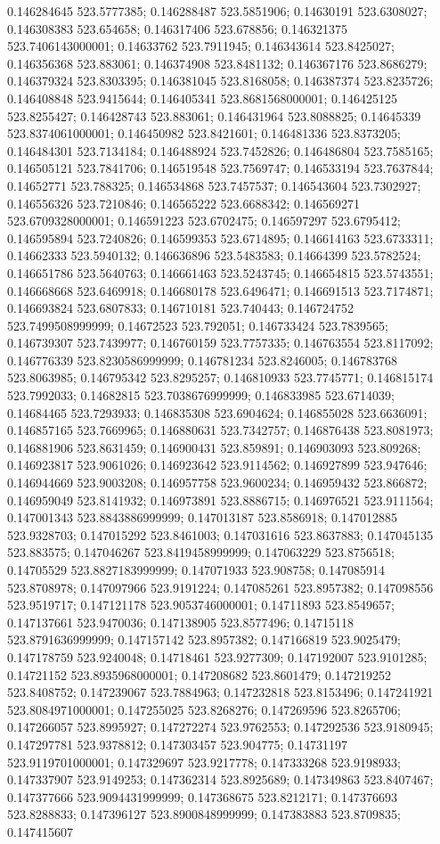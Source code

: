 0.146284645 523.5777385; 0.146288487 523.5851906; 0.14630191 523.6308027; 0.146308383 523.654658; 0.146317406 523.678856; 0.146321375 523.7406143000001; 0.14633762 523.7911945; 0.146343614 523.8425027; 0.146356368 523.883061; 0.146374908 523.8481132; 0.146367176 523.8686279; 0.146379324 523.8303395; 0.146381045 523.8168058; 0.146387374 523.8235726; 0.146408848 523.9415644; 0.146405341 523.8681568000001; 0.146425125 523.8255427; 0.146428743 523.883061; 0.146431964 523.8088825; 0.14645339 523.8374061000001; 0.146450982 523.8421601; 0.146481336 523.8373205; 0.146484301 523.7134184; 0.146488924 523.7452826; 0.146486804 523.7585165; 0.146505121 523.7841706; 0.146519548 523.7569747; 0.146533194 523.7637844; 0.14652771 523.788325; 0.146534868 523.7457537; 0.146543604 523.7302927; 0.146556326 523.7210846; 0.146565222 523.6688342; 0.146569271 523.6709328000001; 0.146591223 523.6702475; 0.146597297 523.6795412; 0.146595894 523.7240826; 0.146599353 523.6714895; 0.146614163 523.6733311; 0.14662333 523.5940132; 0.146636896 523.5483583; 0.14664399 523.5782524; 0.146651786 523.5640763; 0.146661463 523.5243745; 0.146654815 523.5743551; 0.146668668 523.6469918; 0.146680178 523.6496471; 0.146691513 523.7174871; 0.146693824 523.6807833; 0.146710181 523.740443; 0.146724752 523.7499508999999; 0.14672523 523.792051; 0.146733424 523.7839565; 0.146739307 523.7439977; 0.146760159 523.7757335; 0.146763554 523.8117092; 0.146776339 523.8230586999999; 0.146781234 523.8246005; 0.146783768 523.8063985; 0.146795342 523.8295257; 0.146810933 523.7745771; 0.146815174 523.7992033; 0.14682815 523.7038676999999; 0.146833985 523.6714039; 0.14684465 523.7293933; 0.146835308 523.6904624; 0.146855028 523.6636091; 0.146857165 523.7669965; 0.146880631 523.7342757; 0.146876438 523.8081973; 0.146881906 523.8631459; 0.146900431 523.859891; 0.146903093 523.809268; 0.146923817 523.9061026; 0.146923642 523.9114562; 0.146927899 523.947646; 0.146944669 523.9003208; 0.146957758 523.9600234; 0.146959432 523.866872; 0.146959049 523.8141932; 0.146973891 523.8886715; 0.146976521 523.9111564; 0.147001343 523.8843886999999; 0.147013187 523.8586918; 0.147012885 523.9328703; 0.147015292 523.8461003; 0.147031616 523.8637883; 0.147045135 523.883575; 0.147046267 523.8419458999999; 0.147063229 523.8756518; 0.14705529 523.8827183999999; 0.147071933 523.908758; 0.147085914 523.8708978; 0.147097966 523.9191224; 0.147085261 523.8957382; 0.147098556 523.9519717; 0.147121178 523.9053746000001; 0.14711893 523.8549657; 0.147137661 523.9470036; 0.147138905 523.8577496; 0.14715118 523.8791636999999; 0.147157142 523.8957382; 0.147166819 523.9025479; 0.147178759 523.9240048; 0.14718461 523.9277309; 0.147192007 523.9101285; 0.14721152 523.8935968000001; 0.147208682 523.8601479; 0.147219252 523.8408752; 0.147239067 523.7884963; 0.147232818 523.8153496; 0.147241921 523.8084971000001; 0.147255025 523.8268276; 0.147269596 523.8265706; 0.147266057 523.8995927; 0.147272274 523.9762553; 0.147292536 523.9180945; 0.147297781 523.9378812; 0.147303457 523.904775; 0.14731197 523.9119701000001; 0.147329697 523.9217778; 0.147333268 523.9198933; 0.147337907 523.9149253; 0.147362314 523.8925689; 0.147349863 523.8407467; 0.147377666 523.9094431999999; 0.147368675 523.8212171; 0.147376693 523.8288833; 0.147396127 523.8900848999999; 0.147383883 523.8709835; 0.147415607 